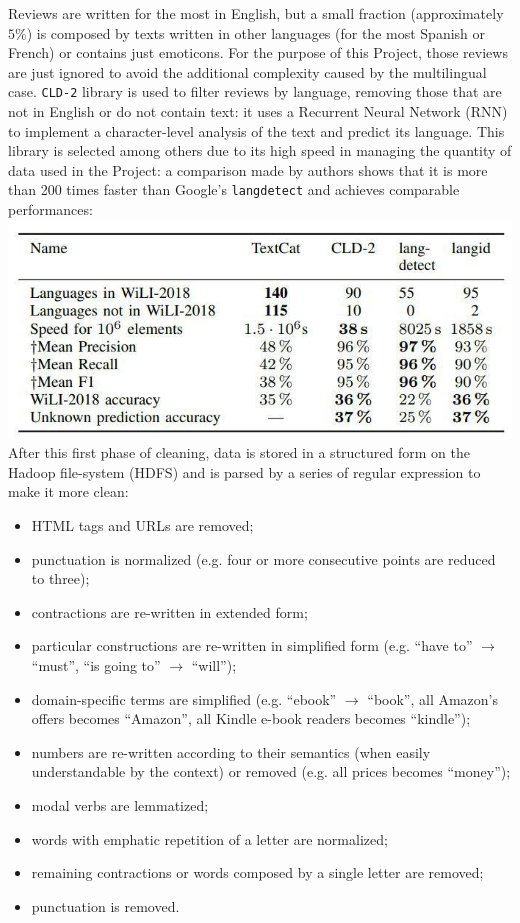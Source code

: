 \documentclass[fleqn,10pt]{SelfArx}
\begin{document}
Reviews are written for the most in English, but a small fraction (approximately $5\%$) is composed by texts written in other languages (for the most Spanish or French) or contains just emoticons.
For the purpose of this Project, those reviews are just ignored to avoid the additional complexity caused by the multilingual case.
\verb|CLD-2|\cite{cld2} library is used to filter reviews by language, removing those that are not in English or do not contain text: it uses a Recurrent Neural Network (RNN) to implement a character-level analysis of the text and predict its language.
This library is selected among others due to its high speed in managing the quantity of data used in the Project: a comparison made by authors shows that it is more than 200 times faster than Google's \verb|langdetect| and achieves comparable performances\cite[6]{cld2}: \newline
\includegraphics[width=\linewidth]{languages}
\newline
After this first phase of cleaning, data is stored in a structured form on the Hadoop file-system (HDFS) and is parsed by a series of regular expression to make it more clean:
\begin{itemize}[noitemsep]
\item HTML tags and URLs are removed;
\item punctuation is normalized (e.g. four or more consecutive points are reduced to three);
\item contractions are re-written in extended form;
\item particular constructions are re-written in simplified form (e.g. ``have to'' $\rightarrow$ ``must'', ``is going to'' $\rightarrow$ ``will'');
\item domain-specific terms are simplified (e.g. ``ebook'' $\rightarrow$ ``book'', all Amazon's offers becomes ``Amazon'', all Kindle e-book readers becomes ``kindle'');
\item numbers are re-written according to their semantics (when easily understandable by the context) or removed (e.g. all prices becomes ``money'');
\item modal verbs are lemmatized;
\item words with emphatic repetition of a letter are normalized;
\item remaining contractions or words composed by a single letter are removed;
\item punctuation is removed.
\end{itemize}
\end{document}
